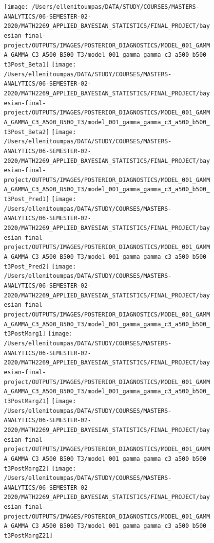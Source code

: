 \documentclass[12pt]{article}
\begin{document}
\begin{figure}[H]
\texttt{[image: /Users/ellenitoumpas/DATA/STUDY/COURSES/MASTERS-ANALYTICS/06-SEMESTER-02-2020/MATH2269\_APPLIED\_BAYESIAN\_STATISTICS/FINAL\_PROJECT/bayesian-final-project/OUTPUTS/IMAGES/POSTERIOR\_DIAGNOSTICS/MODEL\_001\_GAMMA\_GAMMA\_C3\_A500\_B500\_T3/model\_001\_gamma\_gamma\_c3\_a500\_b500\_t3Post\_Beta1]} \texttt{[image: /Users/ellenitoumpas/DATA/STUDY/COURSES/MASTERS-ANALYTICS/06-SEMESTER-02-2020/MATH2269\_APPLIED\_BAYESIAN\_STATISTICS/FINAL\_PROJECT/bayesian-final-project/OUTPUTS/IMAGES/POSTERIOR\_DIAGNOSTICS/MODEL\_001\_GAMMA\_GAMMA\_C3\_A500\_B500\_T3/model\_001\_gamma\_gamma\_c3\_a500\_b500\_t3Post\_Beta2]} \texttt{[image: /Users/ellenitoumpas/DATA/STUDY/COURSES/MASTERS-ANALYTICS/06-SEMESTER-02-2020/MATH2269\_APPLIED\_BAYESIAN\_STATISTICS/FINAL\_PROJECT/bayesian-final-project/OUTPUTS/IMAGES/POSTERIOR\_DIAGNOSTICS/MODEL\_001\_GAMMA\_GAMMA\_C3\_A500\_B500\_T3/model\_001\_gamma\_gamma\_c3\_a500\_b500\_t3Post\_Pred1]} \texttt{[image: /Users/ellenitoumpas/DATA/STUDY/COURSES/MASTERS-ANALYTICS/06-SEMESTER-02-2020/MATH2269\_APPLIED\_BAYESIAN\_STATISTICS/FINAL\_PROJECT/bayesian-final-project/OUTPUTS/IMAGES/POSTERIOR\_DIAGNOSTICS/MODEL\_001\_GAMMA\_GAMMA\_C3\_A500\_B500\_T3/model\_001\_gamma\_gamma\_c3\_a500\_b500\_t3Post\_Pred2]} \texttt{[image: /Users/ellenitoumpas/DATA/STUDY/COURSES/MASTERS-ANALYTICS/06-SEMESTER-02-2020/MATH2269\_APPLIED\_BAYESIAN\_STATISTICS/FINAL\_PROJECT/bayesian-final-project/OUTPUTS/IMAGES/POSTERIOR\_DIAGNOSTICS/MODEL\_001\_GAMMA\_GAMMA\_C3\_A500\_B500\_T3/model\_001\_gamma\_gamma\_c3\_a500\_b500\_t3PostMarg1]} \texttt{[image: /Users/ellenitoumpas/DATA/STUDY/COURSES/MASTERS-ANALYTICS/06-SEMESTER-02-2020/MATH2269\_APPLIED\_BAYESIAN\_STATISTICS/FINAL\_PROJECT/bayesian-final-project/OUTPUTS/IMAGES/POSTERIOR\_DIAGNOSTICS/MODEL\_001\_GAMMA\_GAMMA\_C3\_A500\_B500\_T3/model\_001\_gamma\_gamma\_c3\_a500\_b500\_t3PostMargZ1]} \texttt{[image: /Users/ellenitoumpas/DATA/STUDY/COURSES/MASTERS-ANALYTICS/06-SEMESTER-02-2020/MATH2269\_APPLIED\_BAYESIAN\_STATISTICS/FINAL\_PROJECT/bayesian-final-project/OUTPUTS/IMAGES/POSTERIOR\_DIAGNOSTICS/MODEL\_001\_GAMMA\_GAMMA\_C3\_A500\_B500\_T3/model\_001\_gamma\_gamma\_c3\_a500\_b500\_t3PostMargZ2]} \texttt{[image: /Users/ellenitoumpas/DATA/STUDY/COURSES/MASTERS-ANALYTICS/06-SEMESTER-02-2020/MATH2269\_APPLIED\_BAYESIAN\_STATISTICS/FINAL\_PROJECT/bayesian-final-project/OUTPUTS/IMAGES/POSTERIOR\_DIAGNOSTICS/MODEL\_001\_GAMMA\_GAMMA\_C3\_A500\_B500\_T3/model\_001\_gamma\_gamma\_c3\_a500\_b500\_t3PostMargZ21]} \end{figure}
\end{document}

